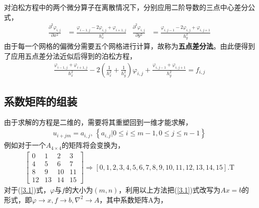 \documentclass{article} %
\begin{document}
对泊松方程中的两个微分算子在离散情况下，分别应用二阶导数的三点中心差分公式，
\begin{align}
    \frac{\partial^2 \varphi_{i,j}}{\partial x^2} & =\frac{\varphi_{i-1,j}-2\varphi_{i,j}+\varphi_{i+1,j}}{h_x^2} & \frac{\partial^2 \varphi_{i,j}}{\partial y^2} & =\frac{\varphi_{i,j-1}-2\varphi_{i,j}+\varphi_{i,j+1}}{h_y^2}
\end{align}
由于每一个网格的偏微分需要五个网格进行计算，故称为\textbf{五点差分法}。由此便得到了应用五点差分法近似后得到的泊松方程，
\begin{align}
    \frac{\varphi_{i-1,j}+\varphi_{i+1,j}}{h_x^2}-2(\frac{1}{h_x^2}+\frac{1}{h_y^2})\varphi_{i,j}+\frac{\varphi_{i,j-1}+\varphi_{i,j+1}}{h_y^2}=f_{i,j} \label{3.1}
\end{align}

\subsection{系数矩阵的组装}
由于求解的方程是二维的，需要将其重塑回到一维才能求解，
\begin{align}
    u_{i+jm}=a_{i,j},\, \left\{a_{i,j}|0\leq i\leq m-1,0\leq j\leq n-1\right\}
\end{align}
例如对于一个$A_{4\times 4}$的矩阵将会变换为，
\begin{align}
    \begin{bmatrix}
        0  & 1  & 2  & 3  \\
        4  & 5  & 6  & 7  \\
        8  & 9  & 10 & 11 \\
        12 & 13 & 14 & 15
    \end{bmatrix}
    \Rightarrow
    \left[0,1,2,3,4,5,6,7,8,9,10,11,12,13,14,15\right].\mathrm{T}
\end{align}
对于(\ref{3.1})式，$\varphi$与$f$的大小为$(m,n)$，利用以上方法把(\ref{3.1})式改写为$Ax=b$的形式，即$\varphi \rightarrow x, f \rightarrow b ,\nabla^2 \rightarrow A$，其中系数矩阵A为，
\end{document}
